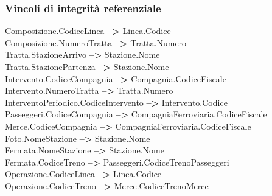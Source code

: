 \documentclass{article}
\begin{document}
\subsubsection*{Vincoli di integrità referenziale}
Composizione.CodiceLinea \textbf{-->} Linea.Codice \vspace*{3pt}\\
Composizione.NumeroTratta \textbf{-->} Tratta.Numero \vspace*{3pt}\\
Tratta.StazioneArrivo \textbf{-->} Stazione.Nome \vspace*{3pt}\\
Tratta.StazionePartenza \textbf{-->} Stazione.Nome \vspace*{3pt}\\
Intervento.CodiceCompagnia \textbf{-->} Compagnia.CodiceFiscale \vspace*{3pt}\\
Intervento.NumeroTratta \textbf{-->} Tratta.Numero \vspace*{3pt}\\
InterventoPeriodico.CodiceIntervento \textbf{-->} Intervento.Codice \vspace*{3pt}\\
Passeggeri.CodiceCompagnia \textbf{-->} CompagniaFerroviaria.CodiceFiscale \vspace*{3pt}\\
Merce.CodiceCompagnia \textbf{-->} CompagniaFerroviaria.CodiceFiscale \vspace*{3pt}\\
Foto.NomeStazione \textbf{-->} Stazione.Nome \vspace*{3pt}\\
Fermata.NomeStazione \textbf{-->} Stazione.Nome \vspace*{3pt}\\
Fermata.CodiceTreno \textbf{-->} Passeggeri.CodiceTrenoPasseggeri \vspace*{3pt}\\
Operazione.CodiceLinea \textbf{-->} Linea.Codice \vspace*{3pt}\\
Operazione.CodiceTreno \textbf{-->} Merce.CodiceTrenoMerce \vspace*{3pt}\\
\end{document}
